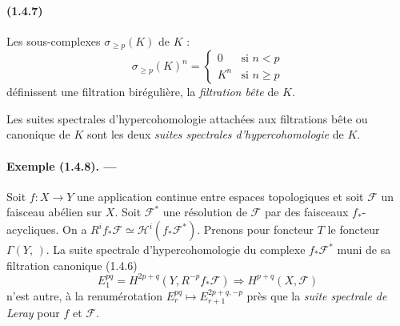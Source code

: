 \documentclass[10pt]{article}
\newcommand{\calH}{\mathcal H}
\newcommand{\calF}{\mathcal F}
\begin{document}
\paragraph{(1.4.7)} Les sous-complexes $\sigma_{\ge p}(K)$ de $K$ :
\[
\sigma_{\ge p}(K)^n=\begin{cases}
0& \text{si }n<p\\
K^n& \text{si }n\ge p
\end{cases}
\]
définissent une filtration birégulière, la \emph{filtration bête} de $K$.

Les suites spectrales d'hypercohomologie attachées aux filtrations bête ou canonique de $K$ sont les deux \emph{suites spectrales d'hypercohomologie} de $K$.

\paragraph{Exemple (1.4.8). ---} Soit $f:X\to Y$ une application continue entre espaces topologiques et soit $\calF$ un faisceau abélien sur $X$. Soit $\calF^*$ une résolution de $\calF$ par des faisceaux $f_*$-acycliques. On a $R^if_*\calF\simeq\calH^i(f_*\calF^*)$. Prenons pour foncteur $T$ le foncteur $\Gamma(Y,\,)$. La suite spectrale d'hypercohomologie du complexe $f_*\calF^*$ muni de sa filtration canonique (1.4.6)
\[
E_1^{pq}=H^{2p+q}(Y,R^{-p}f_*\calF)\Rightarrow H^{p+q}(X,\calF)
\]
n'est autre, à la renumérotation $E_r^{pq}\mapsto E_{r+1}^{2p+q,-p}$ près que la \emph{suite spectrale de Leray} pour $f$ et $\calF$.
\end{document}

